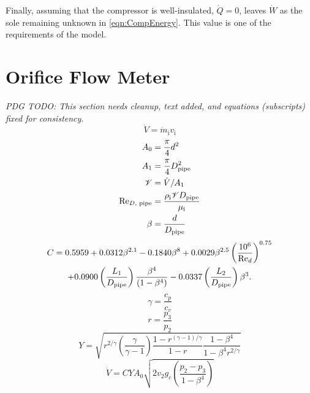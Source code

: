 Finally, assuming that the compressor is well-insulated, 
\ie{} $\dot{Q}=0$, leaves $\dot{W}$ 
as the sole remaining unknown in \cref{eqn:CompEnergy}. 
This value is one of the requirements of the model. 

\section{Orifice Flow Meter} \label{sec:Orifice}
\emph{PDG TODO: This section needs cleanup, text added, and equations (subscripts) fixed for consistency.}
\begin{equation}
  \dot{V} = \dot{m}_{\text{i}}v_{\text{i}}
\end{equation}
\begin{align}
  A_0 &= \frac{\pi}{4} d^2 \\
  A_1 &= \frac{\pi}{4} D_{\text{pipe}}^2 \\
  \mathscr{V} &= \dot{V}/A_1 \\
  \text{Re}_{D,\text{ pipe}} &= \frac{\rho_{\text{i}} \mathscr{V} D_{\text{pipe}}}{\mu_{\text{i}}} \\
  \beta &= \frac{d}{D_{\text{pipe}}}
\end{align}
\begin{multline}
  C = 0.5959 + 0.0312\beta^{2.1} - 0.1840\beta^8 + 0.0029\beta^{2.5}\left(\frac{10^6}{\text{Re}_d}\right)^{0.75} \\ 
      + 0.0900\left(\frac{L_1}{D_{\text{pipe}}}\right)\frac{\beta^4}{\left(1-\beta^4\right)} 
      - 0.0337\left(\frac{L_2}{D_{\text{pipe}}}\right)\beta^3.
\end{multline}
\begin{equation}
  \gamma = \frac{c_p}{c_v}
\end{equation}
\begin{equation}
  r = \frac{p_3}{p_2}
\end{equation}
\begin{equation}
  Y = \sqrt{r^{2/\gamma}\left(\frac{\gamma}{\gamma-1}\right)\frac{1-r^{(\gamma-1)/\gamma}}{1-r}\frac{1-\beta^4}{1-\beta^4r^{2/\gamma}}}
\end{equation}
\begin{equation}
  \dot{V} = C Y A_0 \sqrt{2v_2g_c\left(\frac{p_2-p_3}{1-\beta^4}\right)}
\end{equation}
